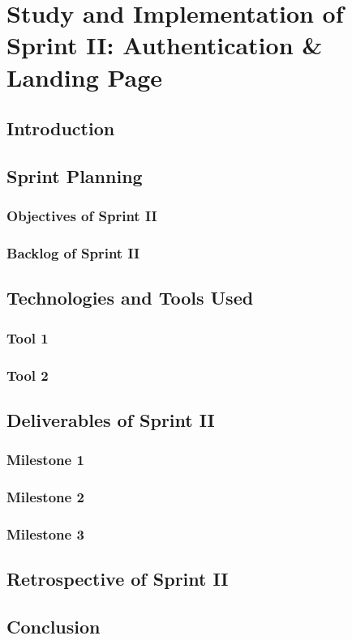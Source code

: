 \documentclass[a4paper,12pt]{report}
\begin{document}
\chapter[Sprint II]{Study and Implementation of Sprint II: Authentication \& Landing Page}

\minitoc
\section{Introduction}
\section{Sprint Planning}
\subsection{Objectives of Sprint II}
\subsection{Backlog of Sprint II}
\section{Technologies and Tools Used}
\subsection{Tool 1}
\subsection{Tool 2}
\section{Deliverables of Sprint II}
\subsection{Milestone 1}
\subsection{Milestone 2}
\subsection{Milestone 3}
\section{Retrospective of Sprint II}
\section{Conclusion}
\end{document}
